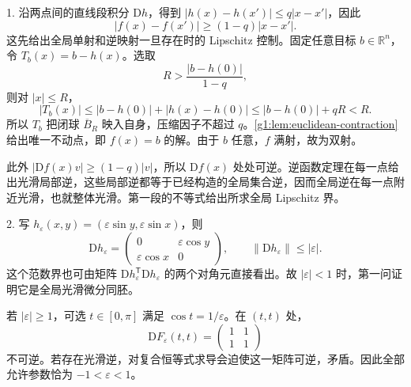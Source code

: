 \begin{solution}
	1. 沿两点间的直线段积分 \(\mathrm{D}h\)，得到 \(|h(x)-h(x')|\leq q|x-x'|\)，因此
	\[
		|f(x)-f(x')|\geq(1-q)|x-x'|.
	\]
	这先给出全局单射和逆映射一旦存在时的 Lipschitz 控制。固定任意目标 \(b\in\mathbb R^n\)，令 \(T_b(x)=b-h(x)\)。选取
	\[
		R>\frac{|b-h(0)|}{1-q},
	\]
	则对 \(|x|\leq R\)，
	\[
		|T_b(x)|\leq|b-h(0)|+|h(x)-h(0)|
		\leq|b-h(0)|+qR<R.
	\]
	所以 \(T_b\) 把闭球 \(\overline B_R\) 映入自身，压缩因子不超过 \(q\)。\cref{g1:lem:euclidean-contraction}给出唯一不动点，即 \(f(x)=b\) 的解。由于 \(b\) 任意，\(f\) 满射，故为双射。

	此外 \(|\mathrm{D}f(x)v|\geq(1-q)|v|\)，所以 \(\mathrm{D}f(x)\) 处处可逆。逆函数定理在每一点给出光滑局部逆，这些局部逆都等于已经构造的全局集合逆，因而全局逆在每一点附近光滑，也就整体光滑。第一段的不等式给出所求全局 Lipschitz 界。

	2. 写 \(h_\varepsilon(x,y)=(\varepsilon\sin y,\varepsilon\sin x)\)，则
	\[
		\mathrm{D}h_\varepsilon=
		\begin{pmatrix}0&\varepsilon\cos y\\\varepsilon\cos x&0\end{pmatrix},
		\qquad \|\mathrm{D}h_\varepsilon\|\leq|\varepsilon|.
	\]
	这个范数界也可由矩阵 \(\mathrm{D}h_\varepsilon^{\mathsf T}\mathrm{D}h_\varepsilon\) 的两个对角元直接看出。故 \(|\varepsilon|<1\) 时，第一问证明它是全局光滑微分同胚。

	若 \(|\varepsilon|\geq1\)，可选 \(t\in[0,\pi]\) 满足 \(\cos t=1/\varepsilon\)。在 \((t,t)\) 处，
	\[
		\mathrm{D}F_\varepsilon(t,t)=\begin{pmatrix}1&1\\1&1\end{pmatrix}
	\]
	不可逆。若存在光滑逆，对复合恒等式求导会迫使这一矩阵可逆，矛盾。因此全部允许参数恰为 \(-1<\varepsilon<1\)。
\end{solution}

